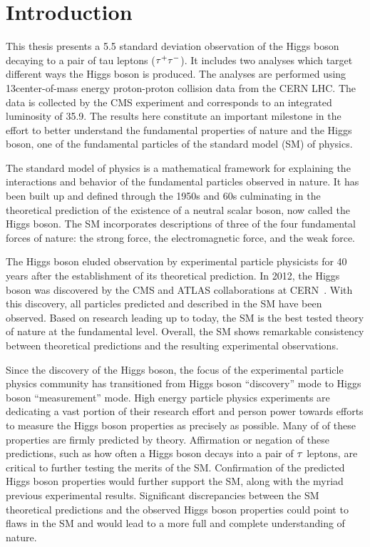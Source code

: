\chapter{Introduction}
\label{sec:introduction}

This thesis presents a 5.5 standard deviation observation of the Higgs boson decaying to a pair
of tau leptons ($\tau^{+}\tau^{-}$). It includes two analyses which target different
ways the Higgs boson is produced. The analyses are performed using
13\TeV center-of-mass energy proton-proton collision data from the CERN LHC.
The data is collected by the CMS experiment and corresponds to an integrated
luminosity of 35.9\fbinv. The results here constitute an important
milestone in the effort to better understand the fundamental properties of nature and
the Higgs boson, one of the fundamental particles of the standard model (SM) of physics.

The standard model of physics is a mathematical framework for explaining
the interactions and behavior of the fundamental particles observed in nature.
It has been built up and defined through the 1950s and 60s culminating in the
theoretical prediction of the existence of a neutral scalar boson, now called the
Higgs boson.
The SM incorporates descriptions of three of the four fundamental forces of nature:
the strong force, the electromagnetic force, and the weak force.

The Higgs boson eluded observation by experimental particle physicists
for 40 years after the establishment of its theoretical prediction. 
In 2012, the Higgs boson was discovered 
by the CMS and ATLAS collaborations at CERN~\cite{Aad:2012tfa, Chatrchyan:2012xdj, Chatrchyan:2013lba}.
With this discovery, all particles predicted and described in the SM have been observed.
Based on research leading up to today, the SM is the best tested theory of nature at the fundamental level.
Overall, the SM shows remarkable consistency between theoretical predictions and
the resulting experimental observations.

Since the discovery of the Higgs boson, the focus of the experimental particle physics community has transitioned from
Higgs boson ``discovery'' mode to Higgs boson ``measurement'' mode. High energy particle physics experiments
are dedicating a vast portion of their research effort and person power towards
efforts to measure the Higgs boson properties as precisely as possible. Many 
of of these properties are firmly predicted by theory. Affirmation or negation of these predictions,
such as how often a Higgs boson decays into a pair of $\tau$ leptons,
are critical to further testing the merits of the SM. Confirmation of the
predicted Higgs boson properties would further support the SM, along with the myriad previous
experimental results. Significant discrepancies between the SM
theoretical predictions and the observed Higgs boson properties could point to
flaws in the SM and would lead to a more full and complete understanding of nature.

